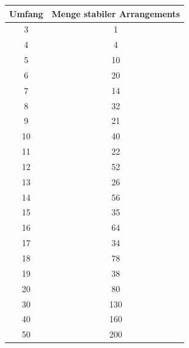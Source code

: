 \documentclass[a4paper,10pt,ngerman,captions=figureheading]{scrartcl}
\begin{document}
\begin{table}[h!t]
    \begin{center}
        \begin{tabularx}{\linewidth}{c|c}
            \textbf{Umfang} & \textbf{Menge stabiler Arrangements} \\
            \midrule
            3               & 1                                    \\
            4               & 4                                    \\
            5               & 10                                   \\
            6               & 20                                   \\
            7               & 14                                   \\
            8               & 32                                   \\
            9               & 21                                   \\
            10              & 40                                   \\
            11              & 22                                   \\
            12              & 52                                   \\
            13              & 26                                   \\
            14              & 56                                   \\
            15              & 35                                   \\
            16              & 64                                   \\
            17              & 34                                   \\
            18              & 78                                   \\
            19              & 38                                   \\
            20              & 80                                   \\
            30              & 130                                  \\
            40              & 160                                  \\
            50              & 200                                  \\

\end{tabularx}
\end{center}
\end{table}
\end{document}
